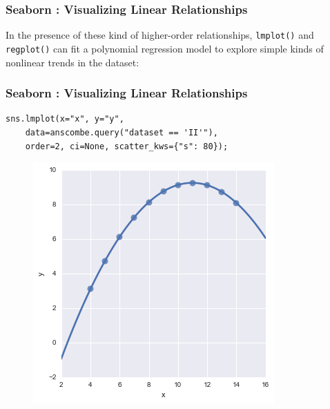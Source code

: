 \documentclass{beamer}
\begin{document}
\begin{frame}[fragile]
	\frametitle{Seaborn : Visualizing Linear Relationships}
	\large	
In the presence of these kind of higher-order relationships, \texttt{lmplot()} and \texttt{regplot()} can fit a polynomial regression model to explore simple kinds of nonlinear trends in the dataset:

\end{frame}
\begin{frame}[fragile]
	\frametitle{Seaborn : Visualizing Linear Relationships}
	\large
\begin{framed}
	\begin{verbatim}
sns.lmplot(x="x", y="y", 
    data=anscombe.query("dataset == 'II'"),
    order=2, ci=None, scatter_kws={"s": 80});
               \end{verbatim}
            \end{framed}
\begin{figure}
	\centering
	\includegraphics[width=0.55\linewidth]{images/regression_23_0}

\end{figure}

\end{frame}
\end{document}

